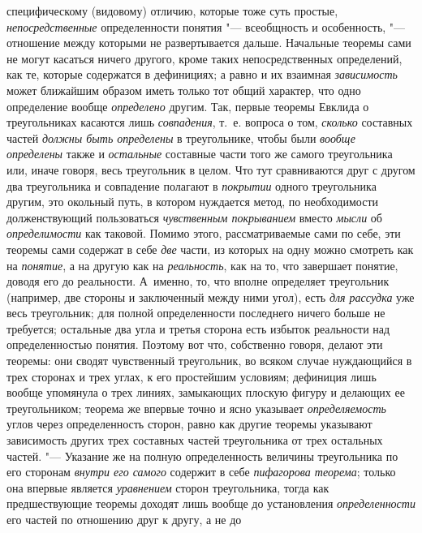 специфическому (видовому) отличию, которые тоже суть простые,
{\em непосредственные}
определенности понятия "--- всеобщность и
особенность, "--- отношение между которыми не развертывается
дальше. Начальные теоремы сами не могут касаться ничего другого, кроме
таких непосредственных определений, как те, которые содержатся в
дефинициях; а равно и их взаимная
{\em зависимость} может
ближайшим образом иметь только тот общий характер, что одно определение
вообще {\em определено}
другим. Так, первые теоремы Евклида о треугольниках касаются
лишь {\em совпадения},
т.~е. вопроса о том,
{\em сколько} составных
частей {\em должны быть определены}
в треугольнике, чтобы были
{\em вообще определены}
также и {\em остальные}
составные части того же самого треугольника или, иначе
говоря, весь треугольник в целом. Что тут сравниваются друг с другом два
треугольника и совпадение полагают в
{\em покрытии} одного
треугольника другим, это окольный путь, в котором нуждается метод, по
необходимости долженствующий пользоваться
{\em чувственным покрыванием}
вместо {\em мысли}
об {\em определимости}
как таковой. Помимо этого, рассматриваемые сами по себе, эти
теоремы сами содержат в себе {\em две}
части, из которых на одну можно смотреть как на
{\em понятие}, а на
другую как на {\em реальность},
как на то, что завершает понятие, доводя его до реальности.
А~именно, то, что вполне определяет треугольник (например, две стороны и
заключенный между ними угол), есть
{\em для рассудка} уже
весь треугольник; для полной определенности последнего ничего больше не
требуется; остальные два угла и третья сторона есть избыток реальности над
определенностью понятия. Поэтому вот что, собственно говоря,
делают эти теоремы: они сводят чувственный треугольник, во всяком случае
нуждающийся в трех сторонах и трех углах, к его простейшим условиям;
дефиниция лишь вообще упомянула о трех линиях, замыкающих плоскую фигуру и
делающих ее треугольником; теорема же впервые точно и ясно указывает
{\em определяемость}
углов через определенность сторон, равно как другие теоремы
указывают зависимость других трех составных частей треугольника от трех
остальных частей. "--- Указание же на полную определенность
величины треугольника по его сторонам
{\em внутри его самого}
содержит в себе
{\em пифагорова теорема};
только она впервые является
{\em уравнением} сторон
треугольника, тогда как предшествующие
теоремы
доходят лишь вообще до установления
{\em определенности} его
частей по отношению друг к другу, а не до
